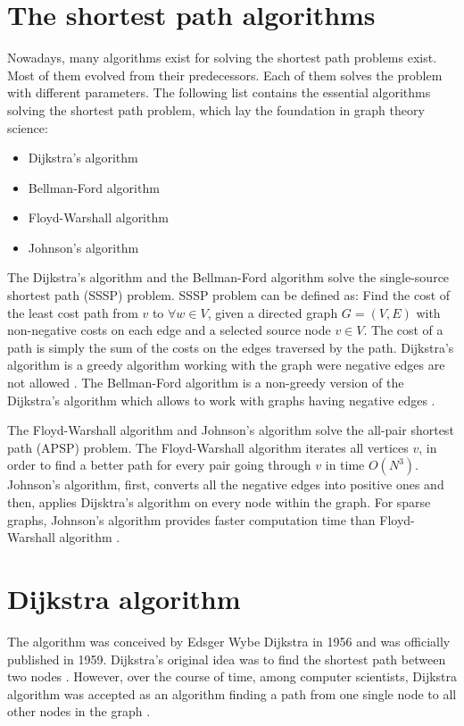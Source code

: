 \documentclass[thesis=M,english]{FITthesis}[2012/10/20]
\begin{document}
\section{The shortest path algorithms}
Nowadays, many algorithms exist for solving the shortest path problems exist. Most of them evolved from their predecessors. Each of them solves the problem with different parameters. 
The following list contains the essential algorithms solving the shortest path problem, which lay the foundation in graph theory science:
\begin{itemize}
\item Dijkstra's algorithm
\item Bellman-Ford algorithm
\item Floyd-Warshall algorithm
\item Johnson's algorithm 
\end{itemize}

The Dijkstra's algorithm \cite{Dijkstra59} and the Bellman-Ford algorithm \cite{Bellman58, FordFulkerson62} solve the single-source shortest path (SSSP) problem. SSSP problem can be defined as: Find the cost of the least cost path from $v$ to $\forall w \in V$, given a directed graph $G = (V,E)$ with non-negative costs on each edge and a selected source node $v \in V$. The cost of a path is simply the sum of the costs on the edges traversed by the path. Dijkstra's algorithm is a greedy algorithm working with the graph were negative edges are not allowed \cite{Dijkstra59}. The Bellman-Ford algorithm is a non-greedy version of the Dijkstra's algorithm which allows to work with graphs having negative edges \cite{Bellman58, FordFulkerson62}.

The Floyd-Warshall algorithm \cite{Warshall62, Floyd56} and Johnson's algorithm \cite{Johnson77} solve the all-pair shortest path (APSP) problem. The Floyd-Warshall algorithm iterates all vertices $v$, in order to find a better path for every pair going through $v$ in time $O(N^3)$. Johnson's algorithm, first, converts all the negative edges into positive ones and then, applies Dijsktra's algorithm on every node within the graph. 
For sparse graphs, Johnson's algorithm provides faster computation time than Floyd-Warshall algorithm \cite{Cormen01}.


\section{Dijkstra algorithm}
\label{sec:dijsktra}
The algorithm was conceived by Edsger Wybe Dijkstra in 1956 and was officially published in 1959. Dijkstra's original idea was to find the shortest path between two nodes \cite{Frana10}. However, over the course of time, among computer scientists, Dijkstra algorithm was accepted as an algorithm finding a path from one single node to all other nodes in the graph \cite{Mehlhorn08}. 
\end{document}
